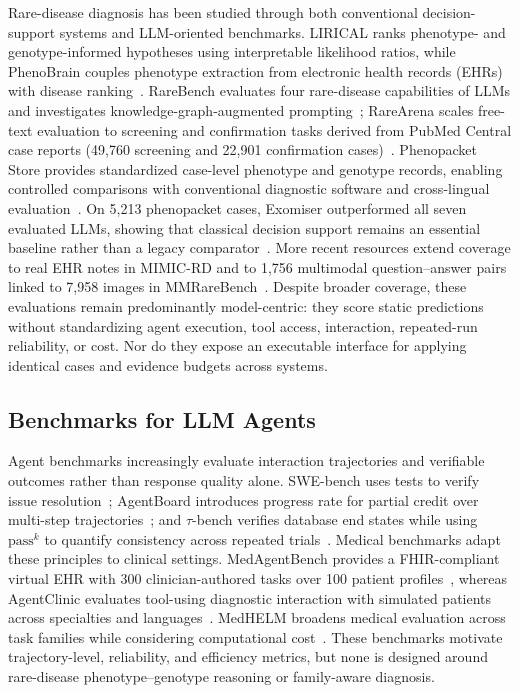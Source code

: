 \documentclass[letterpaper]{article} %
\begin{document}
Rare-disease diagnosis has been studied through both conventional decision-support systems and LLM-oriented benchmarks. LIRICAL ranks phenotype- and genotype-informed hypotheses using interpretable likelihood ratios, while PhenoBrain couples phenotype extraction from electronic health records (EHRs) with disease ranking~\cite{robinson2020lirical,mao2025phenobrain}. RareBench evaluates four rare-disease capabilities of LLMs and investigates knowledge-graph-augmented prompting~\cite{chen2024rarebench}; RareArena scales free-text evaluation to screening and confirmation tasks derived from PubMed Central case reports (49,760 screening and 22,901 confirmation cases)~\cite{chen2026rarearena}. Phenopacket Store provides standardized case-level phenotype and genotype records, enabling controlled comparisons with conventional diagnostic software and cross-lingual evaluation~\cite{danis2025phenopackets,reese2026systematic,chimirri2025consistent}. On 5,213 phenopacket cases, Exomiser outperformed all seven evaluated LLMs, showing that classical decision support remains an essential baseline rather than a legacy comparator~\cite{reese2026systematic}. More recent resources extend coverage to real EHR notes in MIMIC-RD and to 1,756 multimodal question--answer pairs linked to 7,958 images in MMRareBench~\cite{eizaldin2026mimicrd,ning2026mmrarebench}. Despite broader coverage, these evaluations remain predominantly model-centric: they score static predictions without standardizing agent execution, tool access, interaction, repeated-run reliability, or cost. Nor do they expose an executable interface for applying identical cases and evidence budgets across systems.

\subsection{Benchmarks for LLM Agents}

Agent benchmarks increasingly evaluate interaction trajectories and verifiable outcomes rather than response quality alone. SWE-bench uses tests to verify issue resolution~\cite{jimenez2024swebench}; AgentBoard introduces progress rate for partial credit over multi-step trajectories~\cite{ma2024agentboard}; and $\tau$-bench verifies database end states while using $\mathrm{pass}^k$ to quantify consistency across repeated trials~\cite{yao2025taubench}. Medical benchmarks adapt these principles to clinical settings. MedAgentBench provides a FHIR-compliant virtual EHR with 300 clinician-authored tasks over 100 patient profiles~\cite{jiang2025medagentbench}, whereas AgentClinic evaluates tool-using diagnostic interaction with simulated patients across specialties and languages~\cite{schmidgall2026agentclinic}. MedHELM broadens medical evaluation across task families while considering computational cost~\cite{bedi2026medhelm}. These benchmarks motivate trajectory-level, reliability, and efficiency metrics, but none is designed around rare-disease phenotype--genotype reasoning or family-aware diagnosis.
\end{document}
